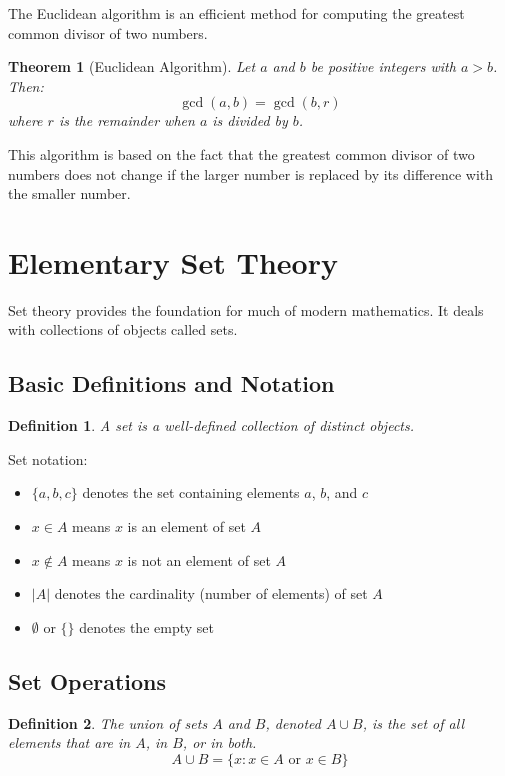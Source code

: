 \documentclass[12pt,a4paper]{article}
\newtheorem{definition}{Definition}
\newtheorem{theorem}{Theorem}
\begin{document}
The Euclidean algorithm is an efficient method for computing the greatest common divisor of two numbers.

\begin{theorem}[Euclidean Algorithm]
Let $a$ and $b$ be positive integers with $a > b$. Then:
\[ \gcd(a,b) = \gcd(b, r) \]
where $r$ is the remainder when $a$ is divided by $b$.
\end{theorem}

This algorithm is based on the fact that the greatest common divisor of two numbers does not change if the larger number is replaced by its difference with the smaller number.

\section{Elementary Set Theory}

Set theory provides the foundation for much of modern mathematics. It deals with collections of objects called sets.

\subsection{Basic Definitions and Notation}

\begin{definition}
A set is a well-defined collection of distinct objects.
\end{definition}

Set notation:
\begin{itemize}
    \item $\{a, b, c\}$ denotes the set containing elements $a$, $b$, and $c$
    \item $x \in A$ means $x$ is an element of set $A$
    \item $x \notin A$ means $x$ is not an element of set $A$
    \item $|A|$ denotes the cardinality (number of elements) of set $A$
    \item $\emptyset$ or $\{\}$ denotes the empty set
\end{itemize}

\subsection{Set Operations}

\begin{definition}
The union of sets $A$ and $B$, denoted $A \cup B$, is the set of all elements that are in $A$, in $B$, or in both.
\[ A \cup B = \{x : x \in A \text{ or } x \in B\} \]
\end{definition}
\end{document}
